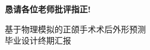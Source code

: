 \documentclass{beamer}
\begin{document}
\section*{}

\begin{frame}
  \begin{center}
    \Huge\normalfont\bfseries
    恳请各位老师批评指正! \\
  \end{center}
  \begin{center}
    \normalfont
    \Large 基于物理模拟的正颌手术术后外形预测 \\
    \normalsize 毕业设计终期汇报
  \end{center}
\end{frame}
\end{document}
